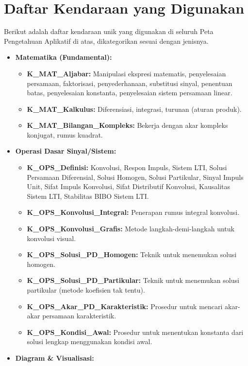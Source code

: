 \documentclass[
  letterpaper,
  DIV=11,
  numbers=noendperiod]{scrreprt}
\providecommand{\tightlist}{%
  \setlength{\itemsep}{0pt}\setlength{\parskip}{0pt}}
\begin{document}
\chapter{Daftar Kendaraan yang
Digunakan}\label{daftar-kendaraan-yang-digunakan}

Berikut adalah daftar kendaraan unik yang digunakan di seluruh Peta
Pengetahuan Aplikatif di atas, dikategorikan sesuai dengan jenisnya.

\begin{itemize}
\item
  \textbf{Matematika (Fundamental):}

  \begin{itemize}
  \tightlist
  \item
    \textbf{K\_MAT\_Aljabar:} Manipulasi ekspresi matematis,
    penyelesaian persamaan, faktorisasi, penyederhanaan, substitusi
    sinyal, penentuan batas, penyelesaian konstanta, penyelesaian sistem
    persamaan linear.
  \item
    \textbf{K\_MAT\_Kalkulus:} Diferensiasi, integrasi, turunan (aturan
    produk).
  \item
    \textbf{K\_MAT\_Bilangan\_Kompleks:} Bekerja dengan akar kompleks
    konjugat, rumus kuadrat.
  \end{itemize}
\item
  \textbf{Operasi Dasar Sinyal/Sistem:}

  \begin{itemize}
  \tightlist
  \item
    \textbf{K\_OPS\_Definisi:} Konvolusi, Respon Impuls, Sistem LTI,
    Solusi Persamaan Diferensial, Solusi Homogen, Solusi Partikular,
    Sinyal Impuls Unit, Sifat Impuls Konvolusi, Sifat Distributif
    Konvolusi, Kausalitas Sistem LTI, Stabilitas BIBO Sistem LTI.
  \item
    \textbf{K\_OPS\_Konvolusi\_Integral:} Penerapan rumus integral
    konvolusi.
  \item
    \textbf{K\_OPS\_Konvolusi\_Grafis:} Metode langkah-demi-langkah
    untuk konvolusi visual.
  \item
    \textbf{K\_OPS\_Solusi\_PD\_Homogen:} Teknik untuk menemukan solusi
    homogen.
  \item
    \textbf{K\_OPS\_Solusi\_PD\_Partikular:} Teknik untuk menemukan
    solusi partikular (metode koefisien tak tentu).
  \item
    \textbf{K\_OPS\_Akar\_PD\_Karakteristik:} Prosedur untuk mencari
    akar-akar persamaan karakteristik.
  \item
    \textbf{K\_OPS\_Kondisi\_Awal:} Prosedur untuk menentukan konstanta
    dari solusi lengkap menggunakan kondisi awal.
  \end{itemize}
\item
  \textbf{Diagram \& Visualisasi:}


\end{itemize}
\end{document}

